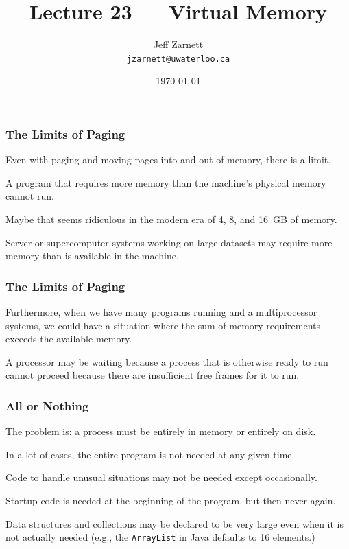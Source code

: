 

\title{Lecture 23 --- Virtual Memory}

\author{Jeff Zarnett \\ \small \texttt{jzarnett@uwaterloo.ca}}
\date{\today}




\begin{frame}
  \titlepage

 \end{frame}



\begin{frame}
\frametitle{The Limits of Paging}

Even with paging and moving pages into and out of memory, there is a limit. 

A program that requires more memory than the machine's physical memory cannot run. 

Maybe that seems ridiculous in the modern era of 4, 8, and 16~GB of memory. 

Server or supercomputer systems working on large datasets may require more memory than is available in the machine.

\end{frame}

\begin{frame}
\frametitle{The Limits of Paging}

Furthermore, when we have many programs running and a multiprocessor systems, we could have a situation where the sum of memory requirements exceeds the available memory. 

A processor may be waiting because a process that is otherwise ready to run cannot proceed because there are insufficient free frames for it to run.

\end{frame}

\begin{frame}
\frametitle{All or Nothing}

The problem is: a process must be entirely in memory or entirely on disk. 

In a lot of cases, the entire program is not needed at any given time. 

Code to handle unusual situations may not be needed except occasionally.

 Startup code is needed at the beginning of the program, but then never again. 
 
Data structures and collections may be declared to be very large even when it is not actually needed (e.g., the \texttt{ArrayList} in Java defaults to 16 elements.)

\end{frame}

